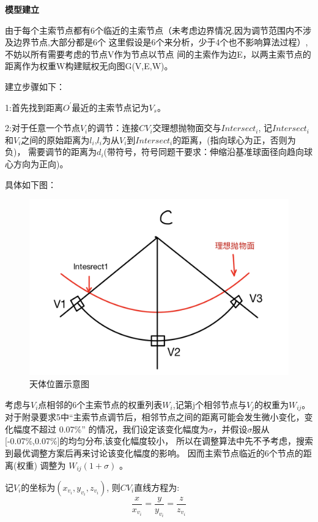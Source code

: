 \documentclass[withoutpreface,bwprint]{cumcmthesis} %
\begin{document}
\textbf{模型建立}

由于每个主索节点都有6个临近的主索节点（未考虑边界情况,因为调节范围内不涉及边界节点,大部分都是6个
这里假设是6个来分析，少于4个也不影响算法过程）,不妨以所有需要考虑的节点V作为节点以节点
间的主索作为边E，以两主索节点的距离作为权重W构建赋权无向图G(V,E,W)。

建立步骤如下：

1:首先找到距离$O^\prime$最近的主索节点记为$V_s$。

2:对于任意一个节点$V_i$的调节：连接$CV_i$交理想抛物面交与$Intersect_i$,
记$Intersect_i$和$V_i$之间的原始距离为$l_i $,$l_i$为从$V_i$到$Intersect_i$的距离，(指向球心为正，否则为负)，
需要调节的距离为$d_i$(带符号，符号同题干要求：伸缩沿基准球面径向趋向球心方向为正向)。

具体如下图：

\begin{figure}[H]
    \centering
    \includegraphics[scale=0.3]{images/wuxiangtu.png}
    \caption{天体位置示意图}
\end{figure}




考虑与$V_i$点相邻的6个主索节点的权重列表$W_i$,记第j个相邻节点与$V_j$的权重为$W_{ij}$。
对于附录要求5中“主索节点调节后，相邻节点之间的距离可能会发生微小变化，变化幅度不超过 0.07\%”
的情况，我们设定该变化幅度为$\sigma $，并假设$\sigma $服从[-0.07\%,0.07\%]的均匀分布,该变化幅度较小，
所以在调整算法中先不予考虑，搜索到最优调整方案后再来讨论该变化幅度的影响。
因而主索节点临近的6个节点的距离(权重) 调整为 $W_{ij}(1+\sigma)$ 。


记$V_i$的坐标为$(x_{v_i},y_{v_i},z_{v_i})$, 则$CV_i$直线方程为:
  $$\frac{x}{x_{v_i}} = \frac{y}{y_{v_i}}=\frac{z}{z_{v_i}}$$
\end{document}
